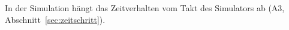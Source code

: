 
In der Simulation hängt das Zeitverhalten vom Takt des Simulators ab (A3, Abschnitt~\ref{sec:zeitschritt}).

